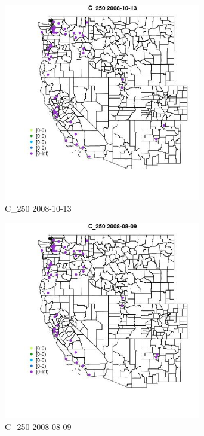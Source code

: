 \begin{figure} 
\centering  
\includegraphics[width=0.77\textwidth]{Code_Outputs/Report_ML_input_PM25_Step4_part_e_de_duplicated_aves_MapObsC_2502008-10-13.jpg} 
\caption{\label{fig:Report_ML_input_PM25_Step4_part_e_de_duplicated_avesMapObsC_2502008-10-13}C_250 2008-10-13} 
\end{figure} 
 

\begin{figure} 
\centering  
\includegraphics[width=0.77\textwidth]{Code_Outputs/Report_ML_input_PM25_Step4_part_e_de_duplicated_aves_MapObsC_2502008-08-09.jpg} 
\caption{\label{fig:Report_ML_input_PM25_Step4_part_e_de_duplicated_avesMapObsC_2502008-08-09}C_250 2008-08-09} 
\end{figure} 
 

